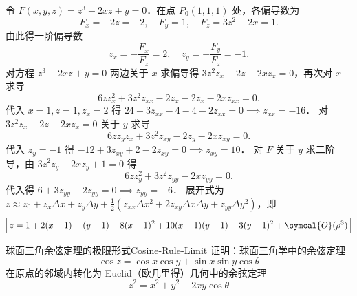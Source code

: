 \begin{solution}
    令 $F(x, y, z) = z^3 - 2xz + y = 0$．在点 $P_0(1, 1, 1)$ 处，各偏导数为
    \begin{equation}
        F_x = -2z = -2, \quad F_y = 1, \quad F_z = 3z^2 - 2x = 1.
    \end{equation}
    由此得一阶偏导数
    \begin{equation}
        z_x = -\frac{F_x}{F_z} = 2, \quad z_y = -\frac{F_y}{F_z} = -1. \label{eq:first-derivative}
    \end{equation}
    对方程 $z^3 - 2xz + y = 0$ 两边关于 $x$ 求偏导得 $3z^2 z_x - 2z - 2xz_x = 0$，再次对 $x$ 求导
    \begin{equation}
        6z z_x^2 + 3z^2 z_{xx} - 2z_x - 2z_x - 2xz_{xx} = 0.
    \end{equation}
    代入 $x=1, z=1, z_x=2$ 得 $24 + 3z_{xx} - 4 - 4 - 2z_{xx} = 0 \implies z_{xx} = -16$．
    对 $3z^2 z_x - 2z - 2xz_x = 0$ 关于 $y$ 求导
    \begin{equation}
        6z z_y z_x + 3z^2 z_{xy} - 2z_y - 2xz_{xy} = 0.
    \end{equation}
    代入 $z_y = -1$ 得 $-12 + 3z_{xy} + 2 - 2z_{xy} = 0 \implies z_{xy} = 10$．
    对 $F$ 关于 $y$ 求二阶导，由 $3z^2 z_y - 2xz_y + 1 = 0$ 得
    \begin{equation}
        6z z_y^2 + 3z^2 z_{yy} - 2xz_{yy} = 0.
    \end{equation}
    代入得 $6 + 3z_{yy} - 2z_{yy} = 0 \implies z_{yy} = -6$．
    展开式为 $z \approx z_0 + z_x \Delta x + z_y \Delta y + \frac{1}{2} (z_{xx} \Delta x^2 + 2z_{xy} \Delta x \Delta y + z_{yy} \Delta y^2)$，即
    \begin{equation}
        \boxed{z = 1 + 2(x - 1) - (y - 1) - 8(x - 1)^2 + 10(x - 1)(y - 1) - 3(y - 1)^2 + \symcal{O}(\rho^3)}
    \end{equation}
\end{solution}

\begin{problem}{球面三角余弦定理的极限形式}{Cosine-Rule-Limit}
    证明：球面三角学中的余弦定理
    \begin{equation}
        \cos z = \cos x \cos y + \sin x \sin y \cos \theta
    \end{equation}
    在原点的邻域内转化为 Euclid（欧几里得）几何中的余弦定理
    \begin{equation}
        z^2 = x^2 + y^2 - 2xy \cos \theta
    \end{equation}
\end{problem}

